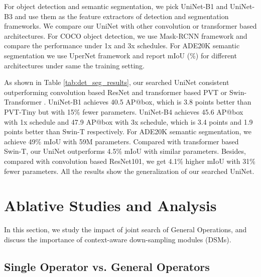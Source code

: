 \documentclass{article} \usepackage{iclr2022_conference,times}
\begin{document}
For object detection and semantic segmentation, we pick UniNet-B1 and UniNet-B3 and use them as the feature extractors of detection and segmentation frameworks. We compare our UniNet with other convolution or transformer based architectures. For COCO object detection, we use Mask-RCNN framework and compare the performance under 1x and 3x schedules. For ADE20K semantic segmentation we use UperNet framework and report mIoU (\%) for different architectures under same the training setting.


As shown in Table \ref{tab:det_seg_results}, our searched UniNet consistent outperforming convolution based ResNet \citep{resnet} and transformer based PVT \citep{pvt} or Swin-Transformer \citep{swin}. UniNet-B1 achieves 40.5 AP@box, which is 3.8 points better than PVT-Tiny but with 15\% fewer parameters. UniNet-B4 achieves 45.6 AP@box with 1x schedule and 47.9 AP@box with 3x schedule, which is 3.4 points and 1.9 points better than Swin-T respectively. For ADE20K semantic segmentation, we achieve 49\% mIoU with 59M parameters. Compared with transformer based Swin-T, our UniNet outperforms 4.5\% mIoU with similar parameters. Besides, compared with convolution based ResNet101, we get 4.1\% higher mIoU with 31\% fewer parameters. All the results show the generalization of our searched UniNet. 

\section{Ablative Studies and Analysis}
\label{ablation}

In this section, we study the impact of joint search of General Operations, and discuss the importance of context-aware down-sampling modules (DSMs).

\subsection{Single Operator vs. General Operators}
\begin{table}[h]
    \centering
    \vspace{-1em}
    \caption{Performance on ImageNet of UniNet with different search settings. Conv-Only represents search UniNet with convolution operator only.}
    \label{tab:with_conv}
\end{table}
\end{document}
